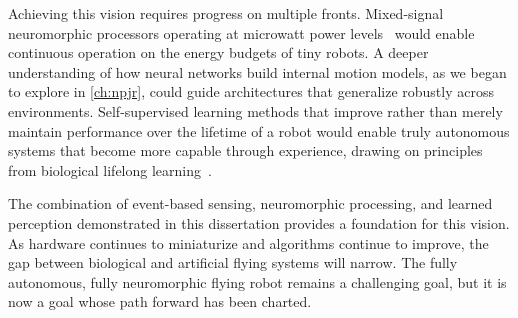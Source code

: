Achieving this vision requires progress on multiple fronts. Mixed-signal neuromorphic processors operating at microwatt power levels~\cite{innatera2025pulsar} would enable continuous operation on the energy budgets of tiny robots. A deeper understanding of how neural networks build internal motion models, as we began to explore in \cref{ch:npjr}, could guide architectures that generalize robustly across environments. Self-supervised learning methods that improve rather than merely maintain performance over the lifetime of a robot would enable truly autonomous systems that become more capable through experience, drawing on principles from biological lifelong learning~\cite{kudithipudi2022biological}.

The combination of event-based sensing, neuromorphic processing, and learned perception demonstrated in this dissertation provides a foundation for this vision. As hardware continues to miniaturize and algorithms continue to improve, the gap between biological and artificial flying systems will narrow. The fully autonomous, fully neuromorphic flying robot remains a challenging goal, but it is now a goal whose path forward has been charted.
